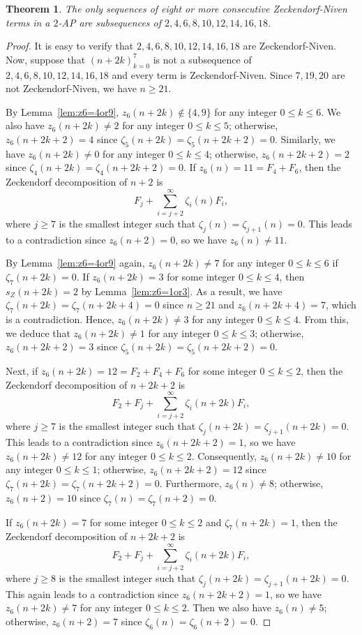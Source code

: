 \documentclass[12pt]{article}
\newtheorem{theorem}{Theorem}[section]
\theoremstyle{definition}
\begin{document}
\begin{theorem}\label{thm:upperbd2AP}
The only sequences of eight or more consecutive Zeckendorf-Niven terms in a $2$-AP are subsequences of $2,4,6,8,10,12,14,16,18$.
\end{theorem}
\begin{proof}
It is easy to verify that $2,4,6,8,10,12,14,16,18$ are Zeckendorf-Niven. Now, suppose that $(n+2k)_{k=0}^7$ is not a subsequence of $2,4,6,8,10,12,14,16,18$ and every term is Zeckendorf-Niven. Since $7,19,20$ are not Zeckendorf-Niven, we have $n\geq21$.

By Lemma~\ref{lem:z6=4or9}, $z_6(n+2k)\notin\{4,9\}$ for any integer $0\leq k\leq6$. We also have $z_6(n+2k)\neq2$ for any integer $0\leq k\leq5$; otherwise, $z_6(n+2k+2)=4$ since $\zeta_5(n+2k)=\zeta_5(n+2k+2)=0$. Similarly, we have $z_6(n+2k)\neq0$ for any integer $0\leq k\leq4$; otherwise, $z_6(n+2k+2)=2$ since $\zeta_4(n+2k)=\zeta_4(n+2k+2)=0$. If $z_6(n)=11=F_4+F_6$, then the Zeckendorf decomposition of $n+2$ is
\[F_j+\sum_{i=j+2}^\infty\zeta_i(n)F_i,\]
where $j\geq7$ is the smallest integer such that $\zeta_j(n)=\zeta_{j+1}(n)=0$. This leads to a contradiction since $z_6(n+2)=0$, so we have $z_6(n)\neq11$.

By Lemma~\ref{lem:z6=4or9} again, $z_6(n+2k)\neq7$ for any integer $0\leq k\leq 6$ if $\zeta_7(n+2k)=0$. If $z_6(n+2k)=3$ for some integer $0\leq k\leq4$, then $s_Z(n+2k)=2$ by Lemma~\ref{lem:z6=1or3}. As a result, we have $\zeta_7(n+2k)=\zeta_7(n+2k+4)=0$ since $n\geq21$ and $z_6(n+2k+4)=7$, which is a contradiction. Hence, $z_6(n+2k)\neq3$ for any integer $0\leq k\leq4$. From this, we deduce that $z_6(n+2k)\neq1$ for any integer $0\leq k\leq3$; otherwise, $z_6(n+2k+2)=3$ since $\zeta_5(n+2k)=\zeta_5(n+2k+2)=0$.

Next, if $z_6(n+2k)=12=F_2+F_4+F_6$ for some integer $0\leq k\leq2$, then the Zeckendorf decomposition of $n+2k+2$ is
\[F_2+F_j+\sum_{i=j+2}^\infty\zeta_i(n+2k)F_i,\]
where $j\geq7$ is the smallest integer such that $\zeta_j(n+2k)=\zeta_{j+1}(n+2k)=0$. This leads to a contradiction since $z_6(n+2k+2)=1$, so we have $z_6(n+2k)\neq12$ for any integer $0\leq k\leq2$. Consequently, $z_6(n+2k)\neq10$ for any integer $0\leq k\leq1$; otherwise, $z_6(n+2k+2)=12$ since $\zeta_7(n+2k)=\zeta_7(n+2k+2)=0$. Furthermore, $z_6(n)\neq8$; otherwise, $z_6(n+2)=10$ since $\zeta_7(n)=\zeta_7(n+2)=0$.

If $z_6(n+2k)=7$ for some integer $0\leq k\leq2$ and $\zeta_7(n+2k)=1$, then the Zeckendorf decomposition of $n+2k+2$ is
\[F_2+F_j+\sum_{i=j+2}^\infty\zeta_i(n+2k)F_i,\]
where $j\geq8$ is the smallest integer such that $\zeta_j(n+2k)=\zeta_{j+1}(n+2k)=0$. This again leads to a contradiction since $z_6(n+2k+2)=1$, so we have $z_6(n+2k)\neq7$ for any integer $0\leq k\leq2$. Then we also have $z_6(n)\neq5$; otherwise, $z_6(n+2)=7$ since $\zeta_6(n)=\zeta_6(n+2)=0$.


\end{proof}
\end{document}
